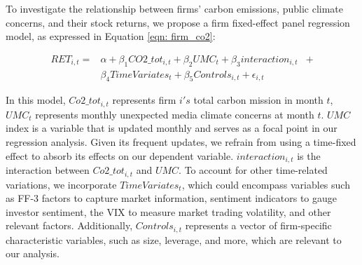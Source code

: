 \documentclass[12pt]{article}
\begin{document}
To investigate the relationship between firms' carbon emissions, public climate concerns, and their stock returns, we propose a firm fixed-effect panel regression model, as expressed in Equation \ref{eqn: firm_co2}:

\begin{equation}
\label{eqn: firm_co2}
\begin{aligned}
RET_{i,t} = & \alpha + \beta_1 CO2\_tot_{i, t} + \beta_2 UMC_{t} + \beta_3 interaction_{i,t} &+ \\
            & \beta_4 Time Variates_t + \beta_5 Controls_{i, t} + \epsilon_{i, t}
\end{aligned}
\end{equation}

In this model, $Co2\_tot_{i,t}$ represents firm $i's$ total carbon mission in month $t$,  $UMC_t$ represents monthly unexpected media climate concerns at month $t$. $UMC$ index is a variable that is updated monthly and serves as a focal point in our regression analysis. Given its frequent updates, we refrain from using a time-fixed effect to absorb its effects on our dependent variable. $interaction_{i,t}$ is the interaction between $Co2\_tot_{i,t}$ and $UMC$. To account for other time-related variations, we incorporate $Time Variates_t$, which could encompass variables such as FF-3 factors to capture market information, sentiment indicators to gauge investor sentiment, the VIX to measure market trading volatility, and other relevant factors. Additionally, $Controls_{i,t}$ represents a vector of firm-specific characteristic variables, such as size, leverage, and more, which are relevant to our analysis.
\end{document}
